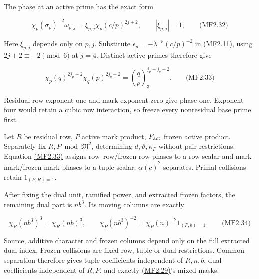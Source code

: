 The phase at an active prime has the exact form

\hypertarget{mf:eq:B2.32}{}

\label{mf:eq:B2.32}

\[
\chi_p(\sigma_p)^{-2}\omega_{p,j}
=\xi_{p,j}\chi_p(c/p)^{2j+2},
\qquad |\xi_{p,j}|=1,
\qquad\text{(MF2.32)}
\]

Here \(\xi_{p,j}\) depends only on \(p,j\). Substitute \(\epsilon_p=-\lambda^{-5}(c/p)^{-2}\) in \protect\hyperlink{mf:eq:B2.11}{(MF2.11)}, using \(2j+2\equiv-2\pmod6\) at \(j=4\). Distinct active primes therefore give

\hypertarget{mf:eq:B2.33}{}

\label{mf:eq:B2.33}

\[
\chi_p(q)^{2j_p+2}\chi_q(p)^{2j_q+2}
=\left(\frac qp\right)_3^{j_p+j_q+2}.
\qquad\text{(MF2.33)}
\]

Residual row exponent one and mark exponent zero give phase one. Exponent four would retain a cubic row interaction, so freeze every nonresidual base prime first.

Let \(R\) be residual row, \(P\) active mark product, \(F_{\rm act}\) frozen active product. Separately fix \(R,P\bmod\mathfrak M^2\), determining \(d,\vartheta,\kappa_F\) without pair restrictions. Equation \protect\hyperlink{mf:eq:B2.33}{(MF2.33)} assigns row--row/frozen-row phases to a row scalar and mark--mark/frozen-mark phases to a tuple scalar; \(\overline{\alpha(c)}^2\) separates. Primal collisions retain \(1_{(P,R)=1}\).

After fixing the dual unit, ramified power, and extracted frozen factors, the remaining dual part is \(nb^3\). Its moving columns are exactly

\hypertarget{mf:eq:B2.34}{}

\label{mf:eq:B2.34}

\[
\chi_R(nb^3)^3=\chi_R(nb)^3,\qquad
\chi_P(nb^3)^{-2}=\chi_P(n)^{-2}1_{(P,b)=1}.
\qquad\text{(MF2.34)}
\]

Source, additive character and frozen columns depend only on the full extracted dual index. Frozen collisions are fixed row, tuple or dual restrictions. Common separation therefore gives tuple coefficients independent of \(R,n,b\), dual coefficients independent of \(R,P\), and exactly \protect\hyperlink{mf:eq:B2.29}{(MF2.29)}'s mixed masks.

\hypertarget{reflected-energy-and-its-two-consequences}{}

\label{reflected-energy-and-its-two-consequences}

